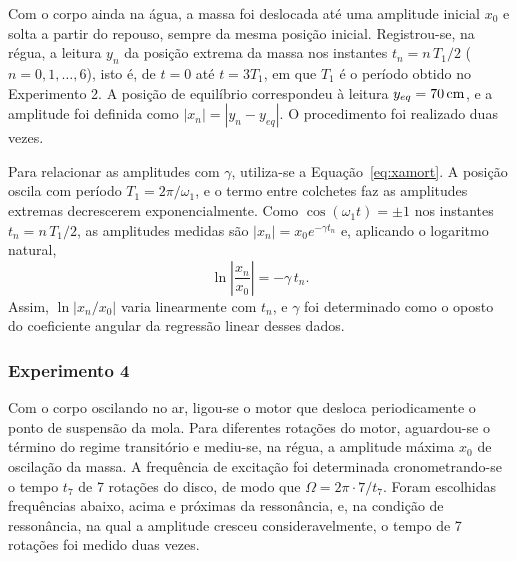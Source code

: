 Com o corpo ainda na água, a massa foi deslocada até uma amplitude inicial $x_0$ e solta a partir do repouso, sempre da mesma posição inicial. Registrou-se, na régua, a leitura $y_n$ da posição extrema da massa nos instantes $t_n=n\,T_1/2$ ($n=0,1,\dots,6$), isto é, de $t=0$ até $t=3T_1$, em que $T_1$ é o período obtido no Experimento 2. A posição de equilíbrio correspondeu à leitura $y_{eq}=70\,\mathrm{cm}$, e a amplitude foi definida como $|x_n|=|y_n-y_{eq}|$. O procedimento foi realizado duas vezes.

Para relacionar as amplitudes com $\gamma$, utiliza-se a Equação~\eqref{eq:xamort}. A posição oscila com período $T_1=2\pi/\omega_1$, e o termo entre colchetes faz as amplitudes extremas decrescerem exponencialmente. Como $\cos(\omega_1t)=\pm1$ nos instantes $t_n=n\,T_1/2$, as amplitudes medidas são $|x_n|=x_0e^{-\gamma t_n}$ e, aplicando o logaritmo natural,
\begin{equation}
\ln\left|\frac{x_n}{x_0}\right|=-\gamma\,t_n.
\label{eq:ln}
\end{equation}
Assim, $\ln|x_n/x_0|$ varia linearmente com $t_n$, e $\gamma$ foi determinado como o oposto do coeficiente angular da regressão linear desses dados.

\subsubsection{Experimento 4}

Com o corpo oscilando no ar, ligou-se o motor que desloca periodicamente o ponto de suspensão da mola. Para diferentes rotações do motor, aguardou-se o término do regime transitório e mediu-se, na régua, a amplitude máxima $x_0$ de oscilação da massa. A frequência de excitação foi determinada cronometrando-se o tempo $t_7$ de 7 rotações do disco, de modo que $\Omega=2\pi\cdot7/t_7$. Foram escolhidas frequências abaixo, acima e próximas da ressonância, e, na condição de ressonância, na qual a amplitude cresceu consideravelmente, o tempo de 7 rotações foi medido duas vezes.

